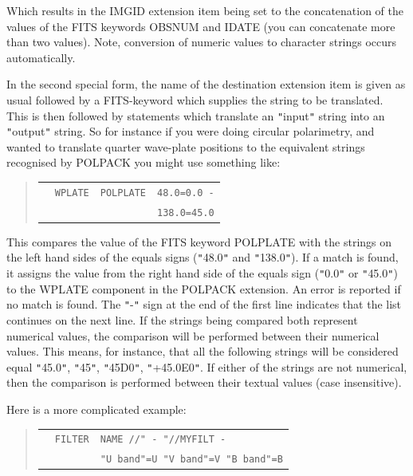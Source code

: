 \documentclass[twoside,11pt]{starlink}
\begin{document}
{{      Which results in the IMGID extension item being set to the
      concatenation of the values of the FITS keywords OBSNUM and
      IDATE (you can concatenate more than two values). Note, conversion
      of numeric values to character strings occurs automatically.

      In the second special form, the name of the destination extension item
      is given as usual followed by a FITS-keyword which supplies the string
      to be translated. This is then followed by statements which translate
      an \texttt{"}input\texttt{"} string into an \texttt{"}output\texttt{"} string. So for instance if you
      were doing circular polarimetry, and wanted to translate quarter
      wave-plate positions to the equivalent strings recognised by POLPACK
      you might use something like:

\begin{quote}
\begin{tabular}{llll}
              &  \texttt{WPLATE}        & \texttt{POLPLATE} &  \texttt{48.0=0.0 -} \\
              &                         &                   &  \texttt{138.0=45.0}
\end{tabular}
\end{quote}

      This compares the value of the FITS keyword POLPLATE with the strings
      on the left hand sides of the equals signs (\texttt{"}48.0\texttt{"} and
      \texttt{"}138.0\texttt{"}). If a match is found, it assigns the value from
      the right hand side of the equals sign (\texttt{"}0.0\texttt{"} or
      \texttt{"}45.0\texttt{"}) to the WPLATE component in the POLPACK extension.
      An error is reported if no match is found. The \texttt{"}-\texttt{"}
      sign at the end of the first line indicates that the list continues
      on the next line. If the strings being compared both represent
      numerical values, the comparison will be performed between their
      numerical values. This means, for instance, that all the following
      strings will be considered equal \texttt{"}45.0\texttt{"}, \texttt{"}45\texttt{"},
      \texttt{"}45D0\texttt{"}, \texttt{"}+45.0E0\texttt{"}. If either of the strings
      are not numerical, then the comparison is performed between their
      textual values (case insensitive).

      Here is a more complicated example:

\begin{quote}
\begin{tabular}{lll}
              &  \texttt{FILTER}        & \texttt{NAME //" - "//MYFILT -} \\
              &                         & \texttt{"U band"=U "V band"=V "B band"=B}
\end{tabular}
\end{quote}

}}
\end{document}
